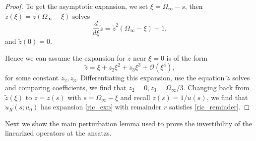 \documentclass[letterpaper,11pt]{article}
\newcommand{\rmO}{\mathcal{O}}
\numberwithin{equation}{section}
\theoremstyle{plain}
\begin{document}
\begin{proof}
To get the asymptotic expansion, we set $\xi = \Omega_\infty-s$, then $\tilde{z}(\xi)=z(\Omega_\infty-\xi)$ solves
\[
\frac{d}{d\xi} \tilde{z} = \tilde{z}^2(\Omega_\infty-\xi)+1,
\]
and $\tilde{z}(0) = 0$.

Hence we can assume the expansion for $\tilde{z}$ near $\xi=0$ is of the form
\[
\tilde{z} = \xi + z_2\xi^2+z_3\xi^3 + \rmO(\xi^4),
\]
for some constant $z_2,z_3$. Differentiating this expansion, use the equation $\tilde{z}$ solves and comparing coefficients, we find that $z_2 = 0, z_3 = \Omega_\infty/3$.  Changing back from $\tilde{z}(\xi)$ to $z=z(s)$ with $s = \Omega_\infty-\xi$ and recall $z(s) = 1/u(s)$, we find that $u_R(s;u_0)$ has expansion \eqref{ric_exp} with remainder $r$ satisfies \eqref{ric_reminder}.


\end{proof}

Next we show the main perturbation lemma used to prove the invertibility of the linearized operators at the ansatzs.
\end{document}
